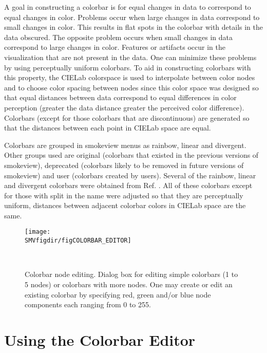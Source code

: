\documentclass[11pt,twoside]{book}
\begin{document}
A goal in constructing a colorbar is for equal changes in data to correspond to
equal changes in color. Problems occur when large changes in data correspond
to small changes in color. This results in flat spots in the colorbar with details in the data  obscured.
The opposite problem occurs when small changes in data correspond to large changes in color.
Features or artifacts occur in the visualization that are not present in the data.
One can minimize these problems by using perceptually uniform colorbars\cite{kovesi2015good}.
To aid in constructing colorbars with this property, the CIELab colorspace is used to interpolate
between color nodes and to choose color spacing between nodes
since this color space was designed so that equal distances between data correspond to equal differences in color perception (greater the data distance greater the perceived color difference).
Colorbars (except for those colorbars that are discontinuous)
are generated so that the distances between each point in CIELab space are equal.

Colorbars are grouped in smokeview menus as rainbow, linear and divergent.
Other groups used are original (colorbars that existed in the previous versions of smokeview),
deprecated (colorbars likely to be
removed in future versions of smokeview) and user (colorbars created by users). Several of the rainbow, linear and divergent
colorbars were obtained from Ref. \cite{ColorCET}.  All of these colorbars except for those with split in the name were adjusted
so that they are perceptually uniform, distances between adjacent colorbar colors in CIELab space are the same.

\begin{figure}[bph]
\begin{center}
\texttt{[image: \\SMVfigdir/figCOLORBAR\_EDITOR]}
\end{center}
\caption[Colorbar node editing.]{ Colorbar node editing.
Dialog box for editing simple colorbars (1 to 5 nodes) or colorbars with more nodes.
One may create or edit an existing colorbar  by
specifying red, green and/or blue node components each ranging from 0 to 255.  }\ \label{figCOLORBAR}
\end{figure}


\section{Using the Colorbar Editor}
\label{section:colorbar}
\end{document}

